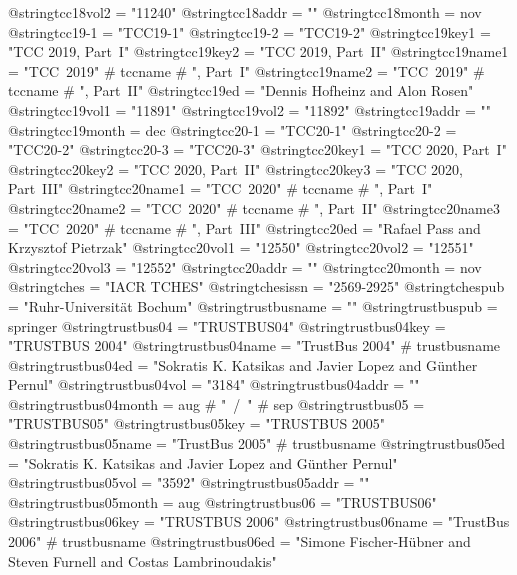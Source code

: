 @string{tcc18vol2 =             "11240"}
@string{tcc18addr =             ""}
@string{tcc18month =            nov}
@string{tcc19-1 =               "TCC19-1"}
@string{tcc19-2 =               "TCC19-2"}
@string{tcc19key1 =             "TCC 2019, Part~I"}
@string{tcc19key2 =             "TCC 2019, Part~II"}
@string{tcc19name1 =            "TCC~2019" # tccname  # ", Part~I"}
@string{tcc19name2 =            "TCC~2019" # tccname  # ", Part~II"}
@string{tcc19ed =               "Dennis Hofheinz and Alon Rosen"}
@string{tcc19vol1 =             "11891"}
@string{tcc19vol2 =             "11892"}
@string{tcc19addr =             ""}
@string{tcc19month =            dec}
@string{tcc20-1 =               "TCC20-1"}
@string{tcc20-2 =               "TCC20-2"}
@string{tcc20-3 =               "TCC20-3"}
@string{tcc20key1 =             "TCC 2020, Part~I"}
@string{tcc20key2 =             "TCC 2020, Part~II"}
@string{tcc20key3 =             "TCC 2020, Part~III"}
@string{tcc20name1 =            "TCC~2020" # tccname  # ", Part~I"}
@string{tcc20name2 =            "TCC~2020" # tccname  # ", Part~II"}
@string{tcc20name3 =            "TCC~2020" # tccname  # ", Part~III"}
@string{tcc20ed =               "Rafael Pass and Krzysztof Pietrzak"}
@string{tcc20vol1 =             "12550"}
@string{tcc20vol2 =             "12551"}
@string{tcc20vol3 =             "12552"}
@string{tcc20addr =             ""}
@string{tcc20month =            nov}
@string{tches =                 "{IACR} {TCHES}"}
@string{tchesissn =             "2569-2925"}
@string{tchespub =              "Ruhr-Universit{\"a}t Bochum"}
@string{trustbusname =          ""}
@string{trustbuspub =           springer}
@string{trustbus04 =            "TRUSTBUS04"}
@string{trustbus04key =         "TRUSTBUS 2004"}
@string{trustbus04name =        "TrustBus 2004" # trustbusname}
@string{trustbus04ed =          "Sokratis K. Katsikas and Javier Lopez and G{\"u}nther Pernul"}
@string{trustbus04vol =         "3184"}
@string{trustbus04addr =        ""}
@string{trustbus04month =       aug # "~/~" # sep}
@string{trustbus05 =            "TRUSTBUS05"}
@string{trustbus05key =         "TRUSTBUS 2005"}
@string{trustbus05name =        "TrustBus 2005" # trustbusname}
@string{trustbus05ed =          "Sokratis K. Katsikas and Javier Lopez and G{\"u}nther Pernul"}
@string{trustbus05vol =         "3592"}
@string{trustbus05addr =        ""}
@string{trustbus05month =       aug}
@string{trustbus06 =            "TRUSTBUS06"}
@string{trustbus06key =         "TRUSTBUS 2006"}
@string{trustbus06name =        "TrustBus 2006" # trustbusname}
@string{trustbus06ed =          "Simone Fischer-H{\"u}bner and Steven Furnell and Costas Lambrinoudakis"}
